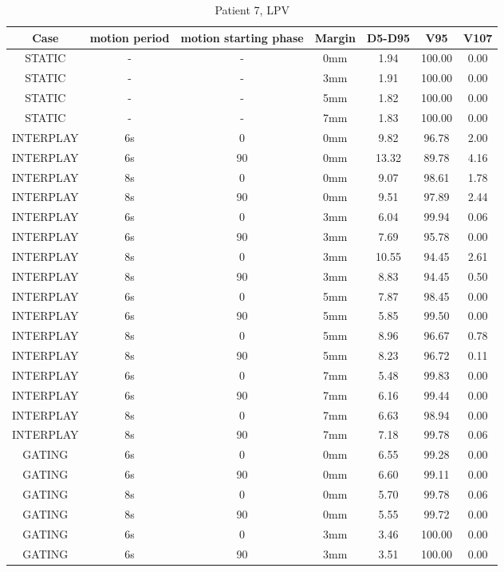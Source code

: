 \begin{table}[H]
  \centering
  \caption{Patient 7, LPV}
  \begin{tabular}{|c||c|c|c||c|c|c|}
    \hline\hline
    Case & motion period & motion starting phase & Margin & D5-D95 & V95 & V107\\
    \hline 
STATIC & - & - & 0mm & 1.94 & 100.00 & 0.00 \\
STATIC & - & - & 3mm & 1.91 & 100.00 & 0.00 \\
STATIC & - & - & 5mm & 1.82 & 100.00 & 0.00 \\
STATIC & - & - & 7mm & 1.83 & 100.00 & 0.00 \\
INTERPLAY & 6s & 0 & 0mm & 9.82 & 96.78 & 2.00 \\
INTERPLAY & 6s & 90 & 0mm & 13.32 & 89.78 & 4.16 \\
INTERPLAY & 8s & 0 & 0mm & 9.07 & 98.61 & 1.78 \\
INTERPLAY & 8s & 90 & 0mm & 9.51 & 97.89 & 2.44 \\
INTERPLAY & 6s & 0 & 3mm & 6.04 & 99.94 & 0.06 \\
INTERPLAY & 6s & 90 & 3mm & 7.69 & 95.78 & 0.00 \\
INTERPLAY & 8s & 0 & 3mm & 10.55 & 94.45 & 2.61 \\
INTERPLAY & 8s & 90 & 3mm & 8.83 & 94.45 & 0.50 \\
INTERPLAY & 6s & 0 & 5mm & 7.87 & 98.45 & 0.00 \\
INTERPLAY & 6s & 90 & 5mm & 5.85 & 99.50 & 0.00 \\
INTERPLAY & 8s & 0 & 5mm & 8.96 & 96.67 & 0.78 \\
INTERPLAY & 8s & 90 & 5mm & 8.23 & 96.72 & 0.11 \\
INTERPLAY & 6s & 0 & 7mm & 5.48 & 99.83 & 0.00 \\
INTERPLAY & 6s & 90 & 7mm & 6.16 & 99.44 & 0.00 \\
INTERPLAY & 8s & 0 & 7mm & 6.63 & 98.94 & 0.00 \\
INTERPLAY & 8s & 90 & 7mm & 7.18 & 99.78 & 0.06 \\
GATING & 6s & 0 & 0mm & 6.55 & 99.28 & 0.00 \\
GATING & 6s & 90 & 0mm & 6.60 & 99.11 & 0.00 \\
GATING & 8s & 0 & 0mm & 5.70 & 99.78 & 0.06 \\
GATING & 8s & 90 & 0mm & 5.55 & 99.72 & 0.00 \\
GATING & 6s & 0 & 3mm & 3.46 & 100.00 & 0.00 \\
GATING & 6s & 90 & 3mm & 3.51 & 100.00 & 0.00 \\

\end{tabular}
\end{table}
